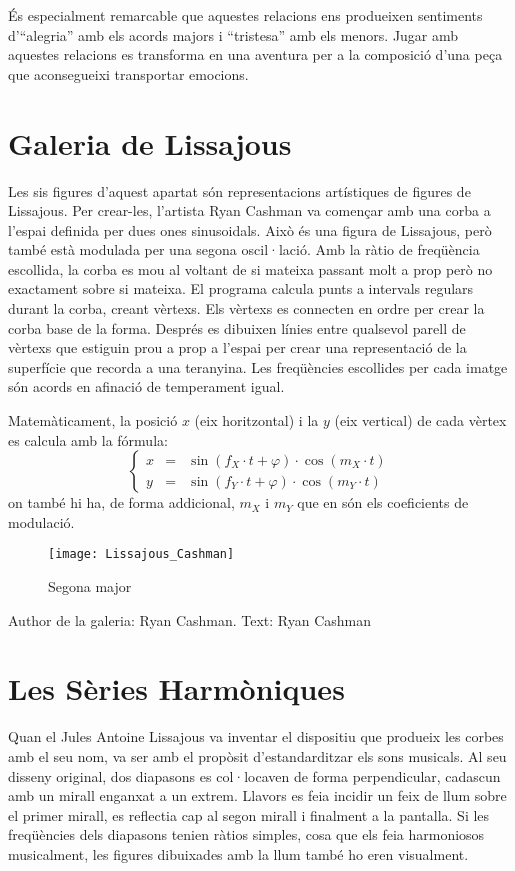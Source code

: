 És especialment remarcable que aquestes relacions ens produeixen sentiments d'``alegria'' amb els acords majors i ``tristesa'' amb els menors. Jugar amb aquestes relacions es transforma en una aventura per a la composició d'una peça que aconsegueixi transportar emocions.


\section{Galeria de Lissajous}
Les sis figures d'aquest apartat són representacions artístiques de figures de Lissajous. Per crear-les, l'artista Ryan Cashman va començar amb una corba a l'espai definida per dues ones sinusoidals. Això és una figura de Lissajous, però també està modulada per una segona oscil·lació. Amb la ràtio de freqüència escollida, la corba es mou al voltant de si mateixa passant molt a prop però no exactament sobre si mateixa. El programa calcula punts a intervals regulars durant la corba, creant vèrtexs. Els vèrtexs es connecten en ordre per crear la corba base de la forma. Després es dibuixen línies entre qualsevol parell de vèrtexs que estiguin prou a prop a l'espai per crear una representació de la superfície que recorda a una teranyina. Les freqüències escollides per cada imatge són acords en afinació de temperament igual.


Matemàticament, la posició $x$ (eix horitzontal) i la $y$ (eix vertical) de cada vèrtex es calcula amb la fórmula:
$$\left\{ \begin{array}{rcl}
x &=& \sin(f_X\cdot t + \varphi) \cdot \cos(m_X \cdot t) \\
y &=& \sin(f_Y\cdot t + \varphi) \cdot \cos(m_Y \cdot t)
\end{array} \right. $$
on també hi ha, de forma addicional, $m_X$ i $m_Y$ que en són els coeficients de modulació.

\begin{figure}[!h]
\centering
\texttt{[image: Lissajous\_Cashman]}
\caption*{Segona major}
\end{figure}


\vfill

Author de la galeria: Ryan Cashman.
Text: Ryan Cashman


\section{Les Sèries Harmòniques}
Quan el Jules Antoine Lissajous va inventar el dispositiu que produeix les corbes amb el seu nom, va ser amb el propòsit d'estandarditzar els sons musicals. Al seu disseny original, dos diapasons es col·locaven de forma perpendicular, cadascun amb un mirall enganxat a un extrem. Llavors es feia incidir un feix de llum sobre el primer mirall, es reflectia cap al segon mirall i finalment a la pantalla. Si les freqüències dels diapasons tenien ràtios simples, cosa que els feia harmoniosos musicalment, les figures dibuixades amb la llum també ho eren visualment.


